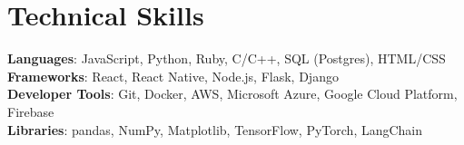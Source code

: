 \documentclass[letterpaper,11pt]{article}
\begin{document}
\section{Technical Skills}
 \begin{itemize}[leftmargin=0.15in, label={}]
    \small{\item{
     \textbf{Languages}{: JavaScript, Python, Ruby, C/C++, SQL (Postgres), HTML/CSS} \\
     \textbf{Frameworks}{: React, React Native, Node.js, Flask, Django} \\
     \textbf{Developer Tools}{: Git, Docker, AWS, Microsoft Azure, Google Cloud Platform, Firebase} \\
     \textbf{Libraries}{: pandas, NumPy, Matplotlib, TensorFlow, PyTorch, LangChain}
    }}
 \end{itemize}

\end{document}
